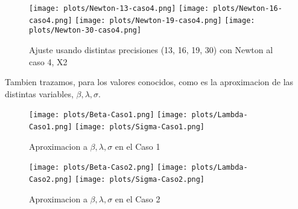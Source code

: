 \begin{figure} [H]

\texttt{[image: plots/Newton-13-caso4.png]}
\texttt{[image: plots/Newton-16-caso4.png]}
\texttt{[image: plots/Newton-19-caso4.png]}
\texttt{[image: plots/Newton-30-caso4.png]}

\caption{Ajuste usando distintas precisiones (13, 16, 19, 30) con Newton al caso 4, X2}
\label{fig:FitCaso4Newton}
\end{figure}


Tambien trazamos, para los valores conocidos, como es la aproximacion de las distintas variables, $\beta, \lambda, \sigma$.

\begin{figure} [H]

\texttt{[image: plots/Beta-Caso1.png]}
\texttt{[image: plots/Lambda-Caso1.png]}
\texttt{[image: plots/Sigma-Caso1.png]}

\caption{Aproximacion a $\beta, \lambda, \sigma$ en el Caso 1}
\label{fig:AproxCaso1}
\end{figure}

\begin{figure} [H]

\texttt{[image: plots/Beta-Caso2.png]}
\texttt{[image: plots/Lambda-Caso2.png]}
\texttt{[image: plots/Sigma-Caso2.png]}

\caption{Aproximacion a $\beta, \lambda, \sigma$ en el Caso 2}
\label{fig:AproxCaso1}
\end{figure}

